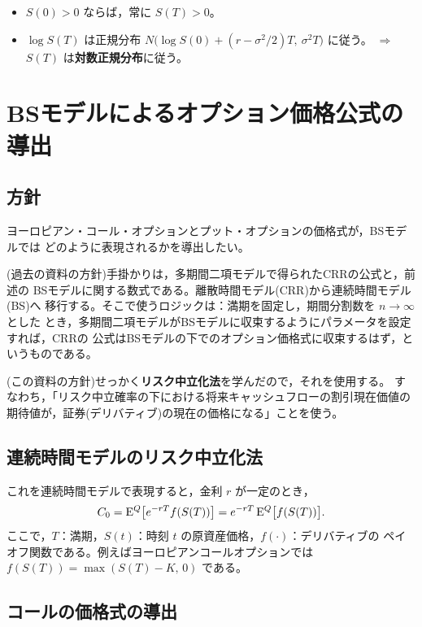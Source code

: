 \begin{keypoint}[BSモデルの特徴]
\begin{itemize}
\item $S(0) > 0$ ならば，常に $S(T) > 0$。
\item $\log S(T)$ は正規分布
$N\bigl(\log S(0) + (r-\sigma^2/2)T,\ \sigma^2 T\bigr)$ に従う。
$\Rightarrow$ $S(T)$ は\textbf{対数正規分布}に従う。
\end{itemize}
\end{keypoint}

\section{BSモデルによるオプション価格公式の導出}

\subsection{方針}

ヨーロピアン・コール・オプションとプット・オプションの価格式が，BSモデルでは
どのように表現されるかを導出したい。

(過去の資料の方針)手掛かりは，多期間二項モデルで得られたCRRの公式と，前述の
BSモデルに関する数式である。離散時間モデル(CRR)から連続時間モデル(BS)へ
移行する。そこで使うロジックは：満期を固定し，期間分割数を $n\to\infty$ とした
とき，多期間二項モデルがBSモデルに収束するようにパラメータを設定すれば，CRRの
公式はBSモデルの下でのオプション価格式に収束するはず，というものである。

(この資料の方針)せっかく\textbf{リスク中立化法}を学んだので，それを使用する。
すなわち，「リスク中立確率の下における将来キャッシュフローの割引現在価値の
期待値が，証券(デリバティブ)の現在の価格になる」ことを使う。

\subsection{連続時間モデルのリスク中立化法}

これを連続時間モデルで表現すると，金利 $r$ が一定のとき，
\begin{equation}
C_0 = \mathrm{E}^Q\bigl[e^{-rT}f(S(T))\bigr] = e^{-rT}\,\mathrm{E}^Q\bigl[f(S(T))\bigr].
\label{eq:rn-valuation}
\end{equation}
ここで，$T$：満期，$S(t)$：時刻 $t$ の原資産価格，$f(\cdot)$：デリバティブの
ペイオフ関数である。例えばヨーロピアンコールオプションでは
$f(S(T)) = \max(S(T)-K,\,0)$ である。

\subsection{コールの価格式の導出}


